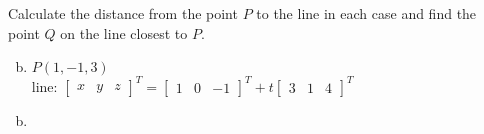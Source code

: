 \documentclass[../main.tex]{subfiles}
\begin{document}
Calculate the distance from the point $P$ to the line in each case and find the point $Q$ on the line closest to $P$.
\begin{enumerate}[a)]
	\setcounter{enumi}{1}
	\item $P(1, -1, 3)$ \\
		line:
		\(
			\begin{bmatrix}x&y&z\end{bmatrix}^T
			=
			\begin{bmatrix}1&0&-1\end{bmatrix}^T
			+
			t\begin{bmatrix}3&1&4\end{bmatrix}^T
		\)
\end{enumerate}

\solution
\begin{enumerate}[a)]
	\setcounter{enumi}{1}
	\item 
\end{enumerate}
\end{document}

